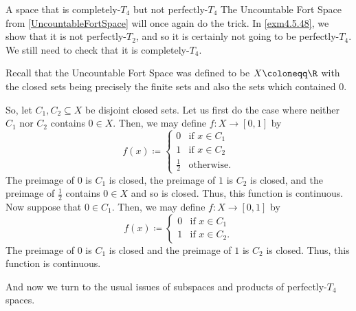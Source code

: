 \begin{exm}{A space that is completely-$T_4$ but not perfectly-$T_4$}{}
The Uncountable Fort Space from \cref{UncountableFortSpace} will once again do the trick.  In \cref{exm4.5.48}, we show that it is not perfectly-$T_2$, and so it is certainly not going to be perfectly-$T_4$.  We still need to check that it is completely-$T_4$.

Recall that the Uncountable Fort Space was defined to be $X\coloneqq \R$ with the closed sets being precisely the finite sets and also the sets which contained $0$.

So, let $C_1,C_2\subseteq X$ be disjoint closed sets.  Let us first do the case where neither $C_1$ nor $C_2$ contains $0\in X$.  Then, we may define $f\colon X\rightarrow [0,1]$ by
\begin{equation}
f(x)\coloneqq \begin{cases}0 & \text{if }x\in C_1 \\ 1 & \text{if }x\in C_2 \\ \tfrac{1}{2} & \text{otherwise.}\end{cases}
\end{equation}
The preimage of $0$ is $C_1$ is closed, the preimage of $1$ is $C_2$ is closed, and the preimage of $\frac{1}{2}$ contains $0\in X$ and so is closed.  Thus, this function is continuous.  Now suppose that $0\in C_1$.  Then, we may define $f\colon X\rightarrow [0,1]$ by
\begin{equation}
f(x)\coloneqq \begin{cases}0 & \text{if }x\in C_1 \\ 1 & \text{if }x\in C_2.\end{cases}
\end{equation}
The preimage of $0$ is $C_1$ is closed and the preimage of $1$ is $C_2$ is closed.  Thus, this function is continuous.
\end{exm}
And now we turn to the usual issues of subspaces and products of perfectly-$T_4$ spaces.

